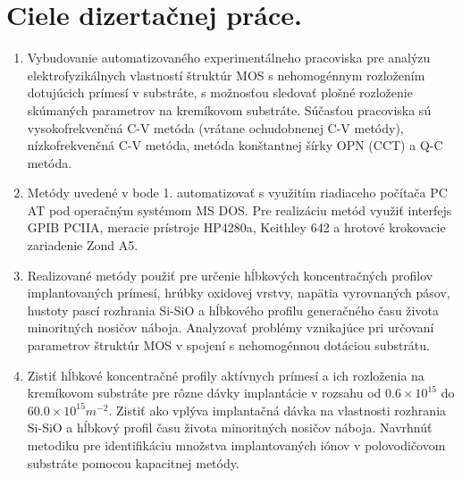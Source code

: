
\chapter{Ciele dizertačnej práce.}%
\label{Chapter2} %

\begin{enumerate}
\item Vybudovanie automatizovaného experimentálneho pracoviska pre
  analýzu elektrofyzikálnych vlastností štruktúr MOS s nehomogénnym
  rozložením dotujúcich prímesí v substráte, s možnosťou sledovať
  plošné rozloženie skúmaných parametrov na kremíkovom substráte.
  Súčasťou pracoviska sú vysokofrekvenčná C-V metóda (vrátane
  ochudobnenej C-V metódy), nízkofrekvenčná C-V metóda, metóda
  konštantnej šírky OPN (CCT) a Q-C metóda.
\item Metódy uvedené v bode 1\@. automatizovať s využitím riadiaceho
  počítača PC AT pod operačným systémom MS DOS\@. Pre realizáciu metód
  využiť interfejs GPIB PCIIA, meracie prístroje HP4280a, Keithley 642
  a hrotové krokovacie zariadenie Zond A5.
\item Realizované metódy použiť pre určenie hĺbkových koncentračných
  profilov implantovaných prímesí, hrúbky oxidovej vrstvy, napätia
  vyrovnaných pásov, hustoty pascí rozhrania Si-SiO a hĺbkového
  profilu generačného času života minoritných nosičov náboja.
  Analyzovať problémy vznikajúce pri určovaní parametrov štruktúr MOS
  v spojení s nehomogénnou dotáciou substrátu.
\item Zistiť hĺbkové koncentračné profily aktívnych prímesí a ich
  rozloženia na kremíkovom substráte pre rôzne dávky implantácie v
  rozsahu od $0.6\times{10}^{15}$ do
  $60.0\times{10}^{15}{m}^{-2}$. Zistiť ako vplýva implantačná dávka
  na vlastnosti rozhrania Si-SiO a hĺbkový profil času života
  minoritných nosičov náboja.  Navrhnúť metodiku pre identifikáciu
  množstva implantovaných iónov v polovodičovom substráte pomocou
  kapacitnej metódy.
\end{enumerate}
